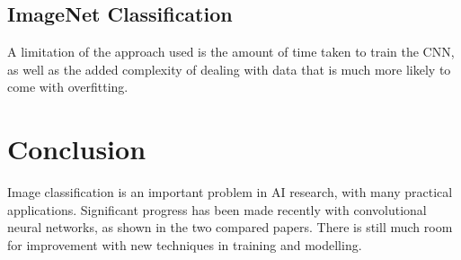 \documentclass{article}
\begin{document}
\subsection{ImageNet Classification}
A limitation of the approach used is the amount of time taken to train the CNN, as well as the added complexity of dealing with data that is much more likely to come with overfitting.

\section{Conclusion}
Image classification is an important problem in AI research, with many practical applications. Significant progress has been made recently with convolutional neural networks, as shown in the two compared papers. There is still much room for improvement with new techniques in training and modelling.

\newpage

\end{document}

